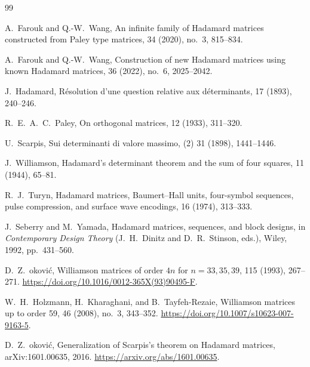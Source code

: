 \documentclass[11pt]{article}
\begin{document}
\begingroup
\small
\begin{thebibliography}{99}

A.~Farouk and Q.-W.~Wang,
\newblock An infinite family of Hadamard matrices constructed from
  Paley type matrices,
 34 (2020), no.\ 3, 815--834.

A.~Farouk and Q.-W.~Wang,
\newblock Construction of new Hadamard matrices using known Hadamard
  matrices,
 36 (2022), no.\ 6, 2025--2042.

J.~Hadamard,
\newblock R\'esolution d'une question relative aux d\'eterminants,
 17 (1893), 240--246.

R.~E.~A.~C.~Paley,
\newblock On orthogonal matrices,
 12 (1933), 311--320.

U.~Scarpis,
\newblock Sui determinanti di valore massimo,
 (2) 31 (1898),
  1441--1446.

J.~Williamson,
\newblock Hadamard's determinant theorem and the sum of four squares,
 11 (1944), 65--81.

R.~J.~Turyn,
\newblock Hadamard matrices, Baumert--Hall units, four-symbol sequences,
  pulse compression, and surface wave encodings,
 16 (1974), 313--333.

J.~Seberry and M.~Yamada,
\newblock Hadamard matrices, sequences, and block designs,
\newblock in {\em Contemporary Design Theory} (J.~H.~Dinitz and
  D.~R.~Stinson, eds.), Wiley, 1992, pp.\ 431--560.

D.~Z.~\DJ okovi\'c,
\newblock Williamson matrices of order \(4n\) for \(n=33,35,39\),
 115 (1993), 267--271.
\newblock \url{https://doi.org/10.1016/0012-365X(93)90495-F}.

W.~H.~Holzmann, H.~Kharaghani, and B.~Tayfeh-Rezaie,
\newblock Williamson matrices up to order 59,
 46 (2008), no.\ 3, 343--352.
\newblock \url{https://doi.org/10.1007/s10623-007-9163-5}.

D.~Z.~\DJ okovi\'c,
\newblock Generalization of Scarpis's theorem on Hadamard matrices,
\newblock arXiv:1601.00635, 2016.
\newblock \url{https://arxiv.org/abs/1601.00635}.


\end{thebibliography}
\end{document}
